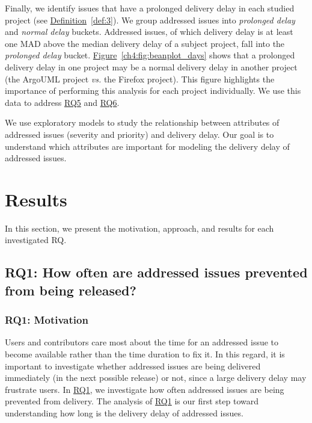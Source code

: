 Finally, we identify issues that have a prolonged delivery delay in each studied
project (see \hyperref[def:3]{Definition}~\ref{def:3}). We group addressed
issues into \textit{prolonged delay} and \textit{normal delay} buckets.
Addressed issues, of which delivery delay is at least one MAD above the median
delivery delay of a subject project, fall into the \textit{prolonged delay}
bucket.  \hyperref[ch4:fig:beanplot_days]{Figure}~\ref{ch4:fig:beanplot_days}
shows that a prolonged delivery delay in one project may be a normal delivery
delay in another project (\eg the ArgoUML project {\em vs.} the Firefox
project). This figure highlights the importance of performing this analysis for
each project individually. We use this data to address \hyperref[ch4:rq5]{RQ5}
and \hyperref[ch4:rq6]{RQ6}.

We use exploratory models to study the relationship between attributes of
addressed issues (\eg severity and priority) and delivery delay. Our goal is to
understand which attributes are important for modeling the delivery delay of
addressed issues. \\

\section{Results} \label{ch3:results}

In this section, we present the motivation, approach, and results for each
investigated RQ. 

\subsection{RQ1: How often are addressed issues prevented
from being released?}\label{ch4:rq1}

\subsubsection*{RQ1: Motivation}

Users and contributors care most about the time for an addressed issue to become
available rather than the time duration to fix it. In this regard, it is
important to investigate whether addressed issues are being delivered
immediately (\eg in the next possible release) or not, since a large delivery
delay may frustrate users. In \hyperref[ch:rq1]{RQ1}, we investigate how often
addressed issues are being prevented from delivery. The analysis of
\hyperref[ch:rq1]{RQ1} is our first step toward understanding how long is the
delivery delay of addressed issues.

